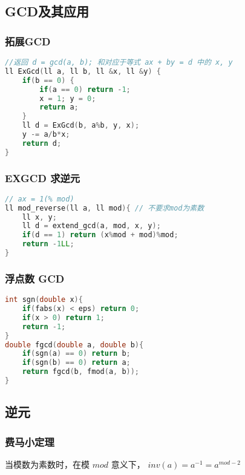 \subsection{GCD及其应用}

\subsubsection{拓展GCD}

\begin{lstlisting}[language=C++]
//返回 d = gcd(a, b); 和对应于等式 ax + by = d 中的 x, y
ll ExGcd(ll a, ll b, ll &x, ll &y) {
    if(b == 0) {
        if(a == 0) return -1;
        x = 1; y = 0;
        return a;
    }
    ll d = ExGcd(b, a%b, y, x);
    y -= a/b*x;
    return d;
}
\end{lstlisting}

\subsubsection{EXGCD 求逆元}

\begin{lstlisting}[language=C++]
// ax = 1(% mod)
ll mod_reverse(ll a, ll mod){ // 不要求mod为素数
    ll x, y;
    ll d = extend_gcd(a, mod, x, y);
    if(d == 1) return (x%mod + mod)%mod;
    return -1LL;
}
\end{lstlisting}

\subsubsection{浮点数 GCD}

\begin{lstlisting}[language=C++]
int sgn(double x){
    if(fabs(x) < eps) return 0;
    if(x > 0) return 1;
    return -1;
}
double fgcd(double a, double b){
    if(sgn(a) == 0) return b;
    if(sgn(b) == 0) return a;
    return fgcd(b, fmod(a, b));
}
\end{lstlisting}

\subsection{逆元}

\subsubsection{费马小定理}

当模数为素数时，在模 $mod$ 意义下， $inv(a) = a^{-1} = a^{mod - 2}$


